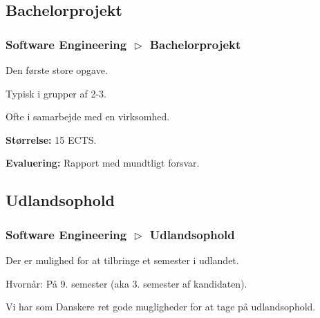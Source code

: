 \begin{frame}[fragile]
{
  }
\end{frame}

\subsection{Bachelorprojekt}
\begin{frame}[fragile]
  \frametitle{Software Engineering $\vartriangleright$ Bachelorprojekt}
  \vspace{3mm}
  Den første store opgave.
  
  \pause
  \vspace{5mm}
  Typisk i grupper af 2-3.
  
  \pause
  \vspace{5mm}
  Ofte i samarbejde med en virksomhed.
  
  \pause
  \vspace{5mm}
  \textbf{Størrelse:} 15 ECTS.
  
  \pause
  \vspace{5mm}
  \textbf{Evaluering:} Rapport med mundtligt forsvar.
\end{frame}

\subsection{Udlandsophold}
\begin{frame}[fragile]
  \frametitle{Software Engineering $\vartriangleright$ Udlandsophold}
  \vspace{3mm}
  Der er mulighed for at tilbringe et semester i udlandet.
  
  \pause
  \vspace{5mm}
  Hvornår: På 9. semester \pause (aka 3. semester af kandidaten).
  
  \pause
  \vspace{5mm}
  Vi har som Danskere ret gode mugligheder for at tage på udlandsophold.
\end{frame}

